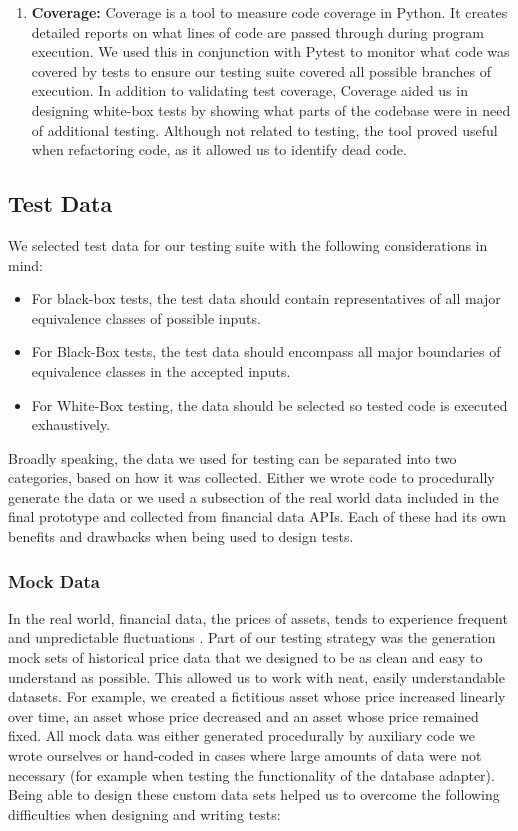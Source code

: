 \documentclass[main.tex]{subfiles}
\begin{document}
\begin{enumerate}
\item \textbf{Coverage:}
Coverage\cite{coverage} is a tool to measure code coverage in Python. It creates detailed reports on what lines of code are passed through during program execution. We used this in conjunction with Pytest to monitor what code was covered by tests to ensure our testing suite covered all possible branches of execution. In addition to validating test coverage, Coverage aided us in designing white-box tests by showing what parts of the codebase were in need of additional testing. Although not related to testing, the tool proved useful when refactoring code, as it allowed us to identify dead code.

\end{enumerate}


\subsection{Test Data}

We selected test data for our testing suite with the following considerations in mind:

\begin{itemize}

\item For black-box tests, the test data should contain representatives of all major equivalence classes of possible inputs.
\item For Black-Box tests, the test data should encompass all major boundaries of equivalence classes in the accepted inputs.
\item For White-Box testing, the data should be selected so tested code is executed exhaustively.

\end{itemize}

Broadly speaking, the data we used for testing can be separated into two categories, based on how it was collected. Either we wrote code to procedurally generate the data or we used a subsection of the real world data included in the final prototype and collected from financial data APIs. Each of these had its own benefits and drawbacks when being used to design tests.

\subsubsection{Mock Data}
In the real world, financial data, the prices of assets, tends to experience frequent and unpredictable fluctuations \cite{bcIsVolatile}. Part of our testing strategy was the generation mock sets of historical price data that we designed to be as clean and easy to understand as possible. This allowed us to work with neat, easily understandable datasets. For example, we created a fictitious asset whose price increased linearly over time, an asset whose price decreased and an asset whose price remained fixed. All mock data was either generated procedurally by auxiliary code we wrote ourselves or hand-coded in cases where large amounts of data were not necessary (for example when testing the functionality of the database adapter). Being able to design these custom data sets helped us to overcome the following difficulties when designing and writing tests:
\end{document}
